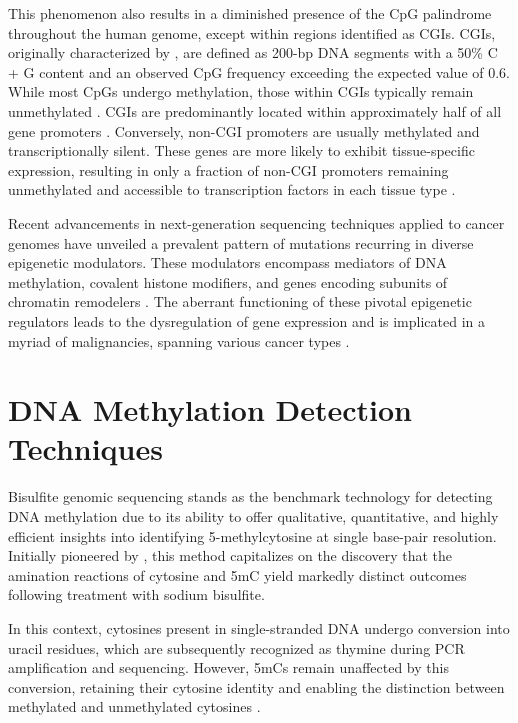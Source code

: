 This phenomenon also results in a diminished presence of the CpG palindrome throughout the human genome, except within regions identified as \acp{CGI}. \acp{CGI}, originally characterized by \cite{cgi}, are defined as 200-bp DNA segments with a 50\% C + G content and an observed CpG frequency exceeding the expected value of 0.6. While most CpGs undergo methylation, those within \acp{CGI} typically remain unmethylated \citep{cgi2}. \acp{CGI} are predominantly located within approximately half of all gene promoters \citep{cgi3}. Conversely, non-\ac{CGI} promoters are usually methylated and transcriptionally silent. These genes are more likely to exhibit tissue-specific expression, resulting in only a fraction of non-CGI promoters remaining unmethylated and accessible to transcription factors in each tissue type \citep{meth_chrom}.

Recent advancements in next-generation sequencing techniques applied to cancer genomes have unveiled a prevalent pattern of mutations recurring in diverse epigenetic modulators. These modulators encompass mediators of DNA methylation, covalent histone modifiers, and genes encoding subunits of chromatin remodelers \citep{meth_cancer}. The aberrant functioning of these pivotal epigenetic regulators leads to the dysregulation of gene expression and is implicated in a myriad of malignancies, spanning various cancer types \citep{meth_cancer2}.

\section{DNA Methylation Detection Techniques}

Bisulfite genomic sequencing stands as the benchmark technology for detecting DNA methylation due to its ability to offer qualitative, quantitative, and highly efficient insights into identifying 5-methylcytosine at single base-pair resolution. Initially pioneered by \cite{bisulfite_ori}, this method capitalizes on the discovery that the amination reactions of cytosine and \ac{5mC} yield markedly distinct outcomes following treatment with sodium bisulfite.

In this context, cytosines present in single-stranded DNA undergo conversion into uracil residues, which are subsequently recognized as thymine during PCR amplification and sequencing. However, \acp{5mC} remain unaffected by this conversion, retaining their cytosine identity and enabling the distinction between methylated and unmethylated cytosines \citep{bisulfite2}. 


